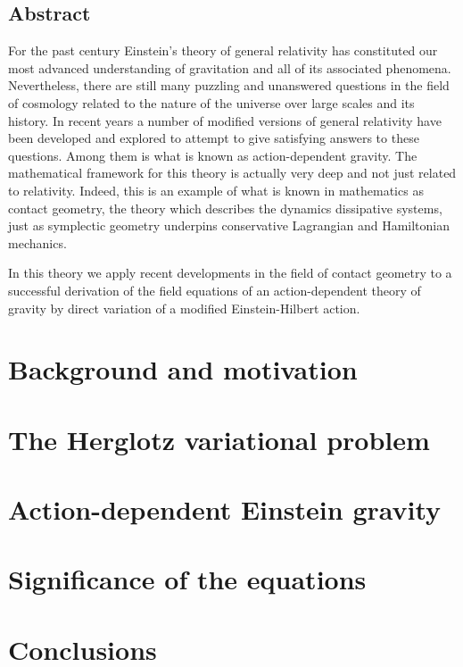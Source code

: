 \documentclass[12pt, oneside]{book}
\begin{document}
\pagebreak
\section*{Abstract}
For the past century Einstein's theory of general relativity has constituted our most
advanced understanding of gravitation and all of its associated phenomena. Nevertheless,
there are still many puzzling and unanswered questions in the field of cosmology related
to the nature of the universe over large scales and its history. In recent years a number
of modified versions of general relativity have been developed and explored to attempt to
give satisfying answers to these questions. Among them is what is known as
action-dependent gravity. The mathematical framework for this theory is actually very deep
and not just related to relativity. Indeed, this is an example of what is known in
mathematics as contact geometry, the theory which describes the dynamics dissipative
systems, just as symplectic geometry underpins conservative Lagrangian and Hamiltonian
mechanics.

In this theory we apply recent developments in the field of contact geometry to a
successful derivation of the field equations of an action-dependent theory of gravity by
direct variation of a modified Einstein-Hilbert action. 

{\footnotesize \sffamily \tableofcontents}

\mainmatter
\pagestyle{main}

\chapter{Background and motivation}


\chapter{The Herglotz variational problem}\label{ch:herglotz}


\chapter{Action-dependent Einstein gravity}\label{ch:einstein}


\chapter{Significance of the equations}\label{ch:significance}


\chapter{Conclusions}\label{ch:conclusions}


\backmatter

\pagestyle{plain}
\printbibliography
\end{document}
